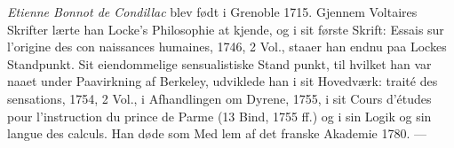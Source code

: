 \documentclass[12pt,a4paper]{book}
\begin{document}
\emph{Etienne Bonnot de Condillac} blev født i Grenoble
1715. Gjennem Voltaires Skrifter lærte han Locke's Philosophie
at kjende, og i sit første Skrift: Essais sur l'origine des con\-%
naissances humaines, 1746, 2 Vol., staaer han endnu paa
Lockes Standpunkt. Sit eiendommelige sensualistiske Stand\-%
punkt, til hvilket han var naaet under Paavirkning af Berkeley,
udviklede han i sit Hovedværk: traité des sensations, 1754,
2 Vol., i Afhandlingen om Dyrene, 1755, i sit Cours d'études
pour l'instruction du prince de Parme (13 Bind, 1755 ff.) og
i sin Logik og sin langue des calculs. Han døde som Med\-%
lem af det franske Akademie 1780. ---
\end{document}
